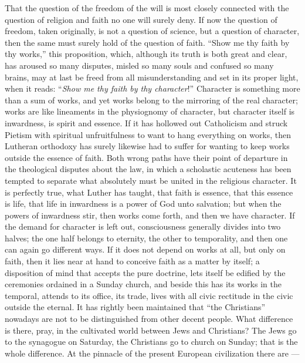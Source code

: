 \documentclass[12pt,a4paper,openany]{book}
\newcommand{\opage}[1]{\marginnote{\footnotesize\textit{[#1]}}}
\begin{document}
That the question of the freedom of the will is most
closely connected with the question of religion and faith
no one will surely deny. If now the question of freedom, taken originally,
is not a question of science, but a question of character,
then the same must surely hold of the question of faith.
``Show me thy faith by thy works,''
this proposition, which, although its truth is both great
\setcounter{footnote}{0}%
\opage{501}and clear, has aroused so many disputes, misled so many
souls and confused so many brains, may at last
be freed from all misunderstanding and set in its
proper light, when it reads: ``\emph{Show me thy faith by thy
character}!'' Character is something more than a sum of
works, and yet works belong to the mirroring
of the real character; works are like lineaments
in the physiognomy of character, but character itself
is inwardness, is spirit and essence. If it has hollowed out Catholicism
and struck Pietism with spiritual unfruitfulness
to want to hang everything on works, then Lutheran
orthodoxy has surely likewise had to suffer for wanting to keep
works outside the essence of faith. Both wrong paths have
their point of departure in the theological disputes about the law, in
which a scholastic acuteness has been tempted
to separate what absolutely must be united in the religious
character. It is perfectly true, what Luther
has taught, that faith is essence, that this essence is life, that
life in inwardness is a power of God unto salvation; but
when the powers of inwardness stir, then works
come forth, and then we have character. If the demand for character is left out,
consciousness generally divides
into two halves; the one half belongs to eternity, the
other to temporality, and then one can again go different
ways. If it does not depend on works at all, but
only on faith, then it lies near at hand to conceive faith
as a matter by itself; a disposition of mind that accepts the pure
doctrine, lets itself be edified by the ceremonies
ordained in a Sunday church, and beside this has its works
in the temporal, attends to its office, its trade,
lives with all civic rectitude in the civic
\setcounter{footnote}{0}%
\opage{502}outside the eternal. It has rightly been maintained that
``the Christians'' nowadays are not to be distinguished from other
decent people. What difference is there, pray, in
the cultivated world between Jews and Christians? The Jews
go to the synagogue on Saturday, the Christians go to church
on Sunday; that is the whole difference. At the pinnacle
of the present European civilization there are ---
\end{document}
